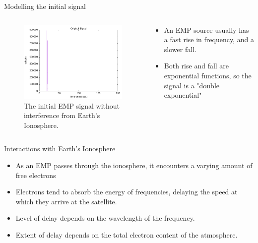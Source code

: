 \documentclass[10pt, aspectratio=168]{beamer}
\begin{document}
    \begin{frame}{Modelling the initial signal}
    \begin{columns}
        \begin{column}{0.4\textwidth}    
            \begin{figure}[h]
                \centering
                \includegraphics[width=1\textwidth]{emp_original_signal.png}
                \caption{The initial EMP signal without interference from Earth's Ionosphere.}
                \label{fig:emp_original_signal}
            \end{figure}
        \end{column}
        \begin{column}{0.4\textwidth}   
            \begin{itemize}
                \item \large An EMP source usually has a fast rise in frequency, and a slower fall.
                \vspace{0.5cm}
                \item Both rise and fall are exponential functions, so the signal is a "double exponential"
            \end{itemize}
        \end{column}
 \end{columns}
 \end{frame}
    
    \begin{frame}{Interactions with Earth's Ionosphere}
    \begin{itemize}
        \item \large As an EMP passes through the ionosphere, it encounters a varying amount of free electrons
        \item Electrons tend to absorb the energy of frequencies, delaying the speed at which they arrive at the satellite.
        \item Level of delay depends on the wavelength of the frequency.
        \item Extent of delay depends on the total electron content of the atmosphere.
    \end{itemize}
    \end{frame}
    
\end{document}

